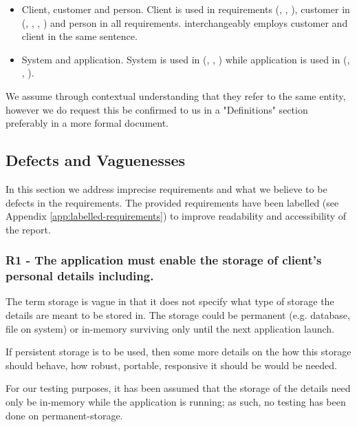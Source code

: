 \begin{itemize} 
	\item Client, customer and person. Client is used in requirements (\ROne, \RTwo, \RFive), customer in (\RTwo, \RThree, \RFour, \RFive) and person in all \REight \space requirements. \RFive \space interchangeably employs customer and client in the same sentence. 
	\item System and application. System is used in (\RTwo, \RSix, \RSeven) while application is used in (\ROne, \RFour, \RFive).
\end{itemize}

We assume through contextual understanding that they refer to the same entity, however we do request this be confirmed to us in a "Definitions" section preferably in a more formal document.
\par


\subsection{Defects and Vaguenesses}

In this section we address imprecise requirements and what we believe to be defects in the requirements. The provided requirements have been labelled (see Appendix \ref{app:labelled-requirements}) to improve readability and accessibility of the report. 

\subsubsection{R1 - The application must enable the storage of client’s personal details including. }

The term storage is vague in that it does not specify what type of storage the details are meant to be stored in. The storage could be permanent (e.g. database, file on system) or in-memory surviving only until the next application launch. 
\par
If persistent storage is to be used, then some more details on the how this storage should behave, how robust, portable, responsive it should be would be needed. 
\par
For our testing purposes, it has been assumed that the storage of the details need only be in-memory while the application is running; as such, no testing has been done on permanent-storage.

